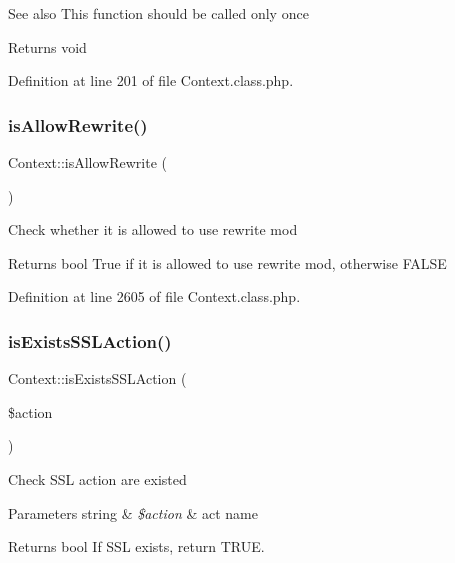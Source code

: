 \begin{DoxySeeAlso}{See also}
This function should be called only once 
\end{DoxySeeAlso}
\begin{DoxyReturn}{Returns}
void 
\end{DoxyReturn}


Definition at line 201 of file Context.\+class.\+php.

\mbox{\label{classContext_aa11482b69f0892e9e8013e08c9914ff4}} 
\subsubsection{\texorpdfstring{is\+Allow\+Rewrite()}{isAllowRewrite()}}
{\footnotesize\ttfamily Context\+::is\+Allow\+Rewrite (\begin{DoxyParamCaption}{ }\end{DoxyParamCaption})}

Check whether it is allowed to use rewrite mod

\begin{DoxyReturn}{Returns}
bool True if it is allowed to use rewrite mod, otherwise F\+A\+L\+SE 
\end{DoxyReturn}


Definition at line 2605 of file Context.\+class.\+php.

\mbox{\label{classContext_ada5b689e4d143f371c38091b87cfd864}} 
\subsubsection{\texorpdfstring{is\+Exists\+S\+S\+L\+Action()}{isExistsSSLAction()}}
{\footnotesize\ttfamily Context\+::is\+Exists\+S\+S\+L\+Action (\begin{DoxyParamCaption}\item[{}]{\$action }\end{DoxyParamCaption})}

Check S\+SL action are existed


\begin{DoxyParams}[1]{Parameters}
string & {\em \$action} & act name \\
\hline
\end{DoxyParams}
\begin{DoxyReturn}{Returns}
bool If S\+SL exists, return T\+R\+UE. 
\end{DoxyReturn}


